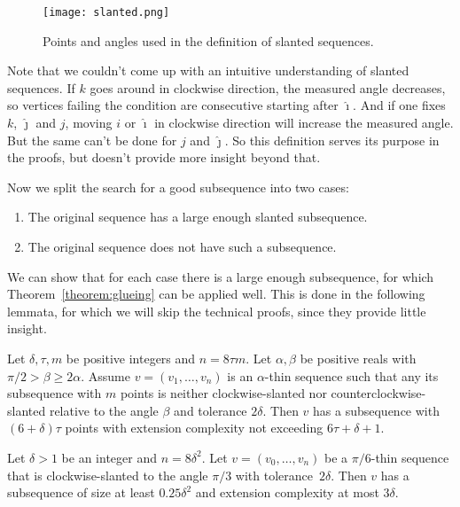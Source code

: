 \begin{figure}[h]
  \centering
  \texttt{[image: slanted.png]}
  \caption{Points and angles used in the definition of slanted sequences.}
  \label{fig:slanted}
\end{figure}

Note that we couldn't come up with an intuitive understanding of slanted sequences. If $k$ goes around in clockwise direction, the measured angle decreases, so vertices failing the condition are consecutive starting after $\hat{\imath}$. And if one fixes $k$, $\hat{\jmath}$ and $j$, moving $i$ or $\hat{\imath}$ in clockwise direction will increase the measured angle. But the same can't be done for $j$ and $\hat{\jmath}$. So this definition serves its purpose in the proofs, but doesn't provide more insight beyond that.

Now we split the search for a good subsequence into two cases:
\begin{enumerate}
  \item The original sequence has a large enough slanted subsequence.
  \item The original sequence does not have such a subsequence.
\end{enumerate}

We can show that for each case there is a large enough subsequence, for which Theorem~\ref{theorem:glueing} can be applied well. This is done in the following lemmata, for which we will skip the technical proofs, since they provide little insight.


\begin{lemma}\label{lemma:unslanted-subseqence}
  Let $\delta, \tau, m$ be positive integers and $n=8\tau m$. Let $\alpha,\beta$ be positive reals with $\pi/2>\beta\geqslant 2\alpha$. Assume $v=(v_1,\ldots,v_n)$ is an $\alpha$-thin sequence such that any its subsequence with $m$ points is neither clockwise-slanted nor counterclockwise-slanted relative to the angle $\beta$ and tolerance $2\delta$. Then $v$ has a subsequence with $(6+\delta)\tau$ points with extension complexity not exceeding $6\tau+\delta+1$.
\end{lemma}

\begin{lemma}\label{lemma:slanted-subsequence}
  Let $\delta>1$ be an integer and $n=8\delta^2$. Let $v=(v_0,\ldots,v_n)$ be a $\pi/6$-thin sequence that is clockwise-slanted to the angle $\pi/3$ with tolerance~$2\delta$. Then $v$ has a subsequence of size at least $0.25\delta^2$ and extension complexity at most $3\delta$.
\end{lemma}

